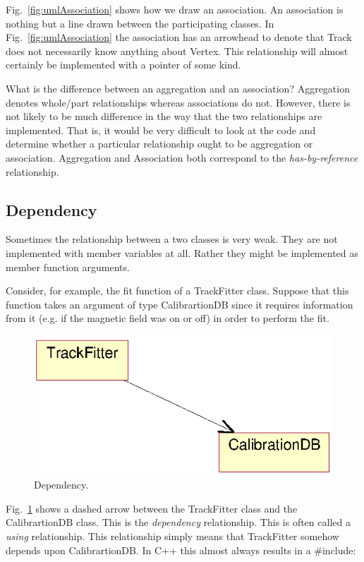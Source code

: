 \documentclass[twoside]{article}
\begin{document}
Fig.~\ref{fig:umlAssociation} shows how we draw an association.  An
association is nothing but a line drawn between the participating
classes. In Fig.~\ref{fig:umlAssociation} the association has an
arrowhead to denote that Track does not necessarily know anything
about Vertex. This relationship will almost certainly be implemented
with a pointer of some kind.

What is the difference between an aggregation and an association?
Aggregation denotes whole/part relationships whereas associations do
not. However, there is not likely to be much difference in the way
that the two relationships are implemented.  That is, it would be very
difficult to look at the code and determine whether a particular
relationship ought to be aggregation or association.  Aggregation and
Association both correspond to the \emph{has-by-reference}
relationship.

\subsection{Dependency}

Sometimes the relationship between a two classes is very weak. They
are not implemented with member variables at all. Rather they might be
implemented as member function arguments.

Consider, for example, the fit function of a TrackFitter class.
Suppose that this function takes an argument of type CalibrartionDB
since it requires information from it (e.g. if the magnetic field was
on or off) in order to perform the fit.
\begin{figure}[htb]
    \begin{center}
        \includegraphics{umlDependency.eps}
        \caption{Dependency.}
        \label{fig:umlDependency}
    \end{center}
\end{figure}
Fig.~\ref{fig:umlDependency} shows a dashed arrow between the
TrackFitter class and the CalibrartionDB class. This is the
\emph{dependency} relationship. This is often called a \emph{using}
relationship.  This relationship simply means that TrackFitter somehow
depends upon CalibrartionDB. In C++ this almost always results in a
\#include:
\end{document}
